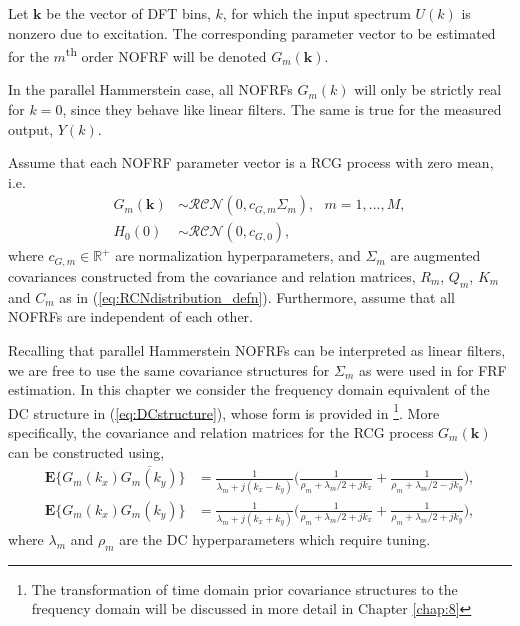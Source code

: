 \begin{notation}
Let $\mathbf{k}$ be the vector of DFT bins, $k$, for which the input spectrum $U(k)$ is nonzero due to excitation. The corresponding parameter vector to be estimated for the $m$\textsuperscript{th} order NOFRF will be denoted $G_m(\mathbf{k})$.
\end{notation}

\begin{rem}
\label{rem:NOFRFrealpart}
In the parallel Hammerstein case, all NOFRFs $G_m(k)$ will only be strictly real for $k=0$, since they behave like linear filters. The same is true for the measured output, $Y(k)$. 
\end{rem}

\begin{assum}
\label{ass:GaussianNOFRFs}
Assume that each NOFRF parameter vector is a RCG process with zero mean, i.e.
\begin{equation}
\begin{split}
\label{eq:NOFRF_GaussianDist}
G_m(\mathbf{k}) &\sim \mathcal{RCN}(0,c_{G,m} \Sigma_m), \ \ \ m=1,\hdots,M, \\
H_0(0) &\sim \mathcal{RCN}(0,c_{G,0}),
\end{split}
\end{equation}
where $c_{G,m} \in \mathbb{R}^+$ are normalization hyperparameters, and $\Sigma_m$ are augmented covariances constructed from the covariance and relation matrices, $R_m$, $Q_m$, $K_m$ and $C_m$ as in (\ref{eq:RCNdistribution_defn}). Furthermore, assume that all NOFRFs are independent of each other.
\end{assum}

Recalling that parallel Hammerstein NOFRFs can be interpreted as linear filters, we are free to use the same covariance structures for $\Sigma_m$ as were used in \cite{Lataire2016} for FRF estimation. In this chapter we consider the frequency domain equivalent of the DC structure in (\ref{eq:DCstructure}), whose form is provided in \cite{Lataire2016}\footnote{The transformation of time domain prior covariance structures to the frequency domain will be discussed in more detail in Chapter \ref{chap:8}}. More specifically, the covariance and relation matrices for the RCG process $G_m(\mathbf{k})$ can be constructed using,
\begin{align}
\mathbf{E} \{ G_m(k_x) \overline{G_m(k_y)} \} &= \frac{1}{\lambda_m + j(k_x - k_y)} \Bigg( \frac{1}{\rho_m+\lambda_m/2+jk_x} + \frac{1}{\rho_m + \lambda_m/2 - jk_y} \Bigg), \label{eq:NOFRF_DC1}\\
\mathbf{E} \{ G_m(k_x) G_m(k_y) \} &= \frac{1}{\lambda_m + j(k_x + k_y)} \Bigg( \frac{1}{\rho_m+\lambda_m/2+jk_x} + \frac{1}{\rho_m + \lambda_m/2 + jk_y} \Bigg), \label{eq:NOFRF_DC2}
\end{align}
where $\lambda_m$ and $\rho_m$ are the DC hyperparameters which require tuning.

